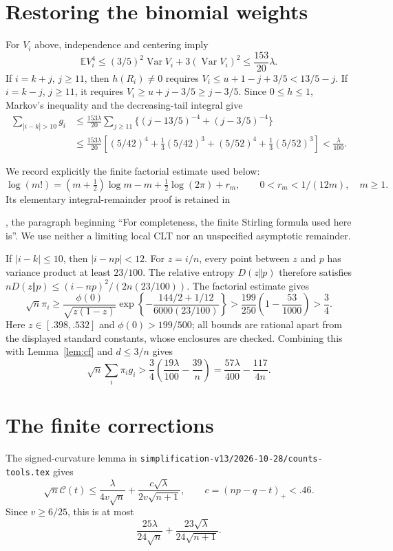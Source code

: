 \documentclass[11pt]{article}
\newcommand{\E}{\mathbb E}\newcommand{\Pp}{\mathbb P}
\begin{document}
\section{Restoring the binomial weights}
For $V_i$ above, independence and centering imply
\[
 \E V_i^4\le(3/5)^2\operatorname{Var}V_i
                +3(\operatorname{Var}V_i)^2
             \le\frac{153}{20}\lambda.
\]
If $i=k+j$, $j\ge11$, then $h(R_i)\ne0$ requires
$V_i\le u+1-j+3/5<13/5-j$.
If $i=k-j$, $j\ge11$, it requires $V_i\ge u+j-3/5\ge j-3/5$.
Since $0\le h\le1$, Markov's inequality and the decreasing-tail integral give
\begin{align*}
 \sum_{|i-k|>10}g_i
 &\le\frac{153\lambda}{20}
       \sum_{j\ge11}\{(j-13/5)^{-4}+(j-3/5)^{-4}\}\\
 &\le\frac{153\lambda}{20}\left[
 (5/42)^4+\frac13(5/42)^3+(5/52)^4+\frac13(5/52)^3\right]
 <\frac\lambda{100}.
\end{align*}

We record explicitly the finite factorial estimate used below:
\[
 \log(m!)=(m+\tfrac12)\log m-m+\tfrac12\log(2\pi)+r_m,
                  \qquad0<r_m<1/(12m),\quad m\ge1.
\]
Its elementary integral-remainder proof is retained in\par\noindent
{}, the paragraph
beginning ``For completeness, the finite Stirling formula used here is''.
We use neither a limiting local CLT nor an unspecified asymptotic remainder.

If $|i-k|\le10$, then $|i-np|<12$. For $z=i/n$, every point between
$z$ and $p$ has variance product at least $23/100$. The relative entropy
$D(z\Vert p)$ therefore satisfies
$nD(z\Vert p)\le(i-np)^2/(2n(23/100))$.
The factorial estimate gives
\[
 \sqrt n\pi_i\ge\frac{\phi(0)}{\sqrt{z(1-z)}}
 \exp\left\{-\frac{144/2+1/12}{6000(23/100)}\right\}
 >\frac{199}{250}\left(1-\frac{53}{1000}\right)>\frac34.
\]
Here $z\in[.398,.532]$ and $\phi(0)>199/500$; all bounds are rational
apart from the displayed standard constants, whose enclosures are checked.
Combining this with Lemma~\ref{lem:cf} and $d\le3/n$ gives
\begin{equation}\label{eq:weightedloss}
 \sqrt n\sum_i\pi_i g_i
    >\frac34\left(\frac{19\lambda}{100}-\frac{39}{n}\right)
     =\frac{57\lambda}{400}-\frac{117}{4n}.
\end{equation}

\section{The finite corrections}
The signed-curvature lemma in
\texttt{simplification-v13/2026-10-28/counts-tools.tex} gives
\[
 \sqrt n\mathcal C(t)\le\frac\lambda{4v\sqrt n}
         +\frac{c\sqrt\lambda}{2v\sqrt{n+1}},\qquad
 c=(np-q-t)_+<.46.
\]
Since $v\ge6/25$, this is at most
\begin{equation}\label{eq:curvature}
          \frac{25\lambda}{24\sqrt n}
               +\frac{23\sqrt\lambda}{24\sqrt{n+1}}.
\end{equation}
\end{document}
